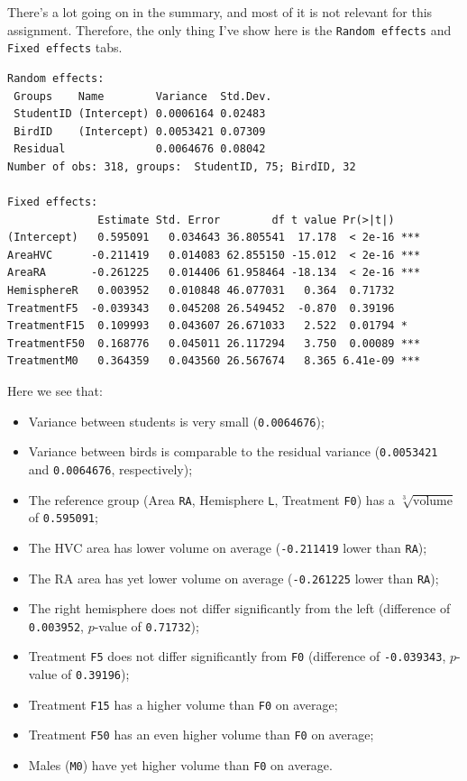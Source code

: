 \documentclass[
]{book}
\providecommand{\tightlist}{%
  \setlength{\itemsep}{0pt}\setlength{\parskip}{0pt}}
\begin{document}
There's a lot going on in the summary, and most of it is not relevant for this assignment. Therefore, the only thing I've show here is the \texttt{Random\ effects} and \texttt{Fixed\ effects} tabs.

\begin{verbatim}
Random effects:
 Groups    Name        Variance  Std.Dev.
 StudentID (Intercept) 0.0006164 0.02483 
 BirdID    (Intercept) 0.0053421 0.07309 
 Residual              0.0064676 0.08042 
Number of obs: 318, groups:  StudentID, 75; BirdID, 32

Fixed effects:
              Estimate Std. Error        df t value Pr(>|t|)    
(Intercept)   0.595091   0.034643 36.805541  17.178  < 2e-16 ***
AreaHVC      -0.211419   0.014083 62.855150 -15.012  < 2e-16 ***
AreaRA       -0.261225   0.014406 61.958464 -18.134  < 2e-16 ***
HemisphereR   0.003952   0.010848 46.077031   0.364  0.71732    
TreatmentF5  -0.039343   0.045208 26.549452  -0.870  0.39196    
TreatmentF15  0.109993   0.043607 26.671033   2.522  0.01794 *  
TreatmentF50  0.168776   0.045011 26.117294   3.750  0.00089 ***
TreatmentM0   0.364359   0.043560 26.567674   8.365 6.41e-09 ***
\end{verbatim}

Here we see that:

\begin{itemize}
\tightlist
\item
  Variance between students is very small (\texttt{0.0064676});
\item
  Variance between birds is comparable to the residual variance (\texttt{0.0053421} and \texttt{0.0064676}, respectively);
\item
  The reference group (Area \texttt{RA}, Hemisphere \texttt{L}, Treatment \texttt{F0}) has a \(\sqrt[3]{\text{volume}}\) of \texttt{0.595091};
\item
  The HVC area has lower volume on average (\texttt{-0.211419} lower than \texttt{RA});
\item
  The RA area has yet lower volume on average (\texttt{-0.261225} lower than \texttt{RA});
\item
  The right hemisphere does not differ significantly from the left (difference of \texttt{0.003952}, \(p\)-value of \texttt{0.71732});
\item
  Treatment \texttt{F5} does not differ significantly from \texttt{F0} (difference of \texttt{-0.039343}, \(p\)-value of \texttt{0.39196});
\item
  Treatment \texttt{F15} has a higher volume than \texttt{F0} on average;
\item
  Treatment \texttt{F50} has an even higher volume than \texttt{F0} on average;
\item
  Males (\texttt{M0}) have yet higher volume than \texttt{F0} on average.
\end{itemize}
\end{document}
